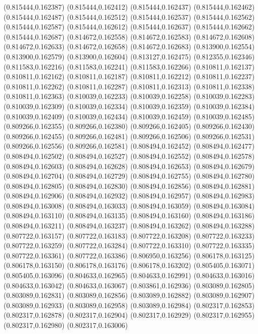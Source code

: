 (0.815444,0.162387)
(0.815444,0.162412)
(0.815444,0.162437)
(0.815444,0.162462)
(0.815444,0.162487)
(0.815444,0.162512)
(0.815444,0.162537)
(0.815444,0.162562)
(0.815444,0.162587)
(0.815444,0.162612)
(0.815444,0.162637)
(0.815444,0.162662)
(0.815444,0.162687)
(0.814672,0.162558)
(0.814672,0.162583)
(0.814672,0.162608)
(0.814672,0.162633)
(0.814672,0.162658)
(0.814672,0.162683)
(0.813900,0.162554)
(0.813900,0.162579)
(0.813900,0.162604)
(0.813127,0.162475)
(0.812355,0.162346)
(0.811583,0.162216)
(0.811583,0.162241)
(0.811583,0.162266)
(0.810811,0.162137)
(0.810811,0.162162)
(0.810811,0.162187)
(0.810811,0.162212)
(0.810811,0.162237)
(0.810811,0.162262)
(0.810811,0.162287)
(0.810811,0.162313)
(0.810811,0.162338)
(0.810811,0.162363)
(0.810039,0.162233)
(0.810039,0.162258)
(0.810039,0.162283)
(0.810039,0.162309)
(0.810039,0.162334)
(0.810039,0.162359)
(0.810039,0.162384)
(0.810039,0.162409)
(0.810039,0.162434)
(0.810039,0.162459)
(0.810039,0.162485)
(0.809266,0.162355)
(0.809266,0.162380)
(0.809266,0.162405)
(0.809266,0.162430)
(0.809266,0.162455)
(0.809266,0.162481)
(0.809266,0.162506)
(0.809266,0.162531)
(0.809266,0.162556)
(0.809266,0.162581)
(0.808494,0.162452)
(0.808494,0.162477)
(0.808494,0.162502)
(0.808494,0.162527)
(0.808494,0.162552)
(0.808494,0.162578)
(0.808494,0.162603)
(0.808494,0.162628)
(0.808494,0.162653)
(0.808494,0.162679)
(0.808494,0.162704)
(0.808494,0.162729)
(0.808494,0.162755)
(0.808494,0.162780)
(0.808494,0.162805)
(0.808494,0.162830)
(0.808494,0.162856)
(0.808494,0.162881)
(0.808494,0.162906)
(0.808494,0.162932)
(0.808494,0.162957)
(0.808494,0.162983)
(0.808494,0.163008)
(0.808494,0.163033)
(0.808494,0.163059)
(0.808494,0.163084)
(0.808494,0.163110)
(0.808494,0.163135)
(0.808494,0.163160)
(0.808494,0.163186)
(0.808494,0.163211)
(0.808494,0.163237)
(0.808494,0.163262)
(0.808494,0.163288)
(0.807722,0.163157)
(0.807722,0.163183)
(0.807722,0.163208)
(0.807722,0.163233)
(0.807722,0.163259)
(0.807722,0.163284)
(0.807722,0.163310)
(0.807722,0.163335)
(0.807722,0.163361)
(0.807722,0.163386)
(0.806950,0.163256)
(0.806178,0.163125)
(0.806178,0.163150)
(0.806178,0.163176)
(0.806178,0.163202)
(0.805405,0.163071)
(0.805405,0.163096)
(0.804633,0.162965)
(0.804633,0.162991)
(0.804633,0.163016)
(0.804633,0.163042)
(0.804633,0.163067)
(0.803861,0.162936)
(0.803089,0.162805)
(0.803089,0.162831)
(0.803089,0.162856)
(0.803089,0.162882)
(0.803089,0.162907)
(0.803089,0.162933)
(0.803089,0.162958)
(0.803089,0.162984)
(0.802317,0.162853)
(0.802317,0.162878)
(0.802317,0.162904)
(0.802317,0.162929)
(0.802317,0.162955)
(0.802317,0.162980)
(0.802317,0.163006)

